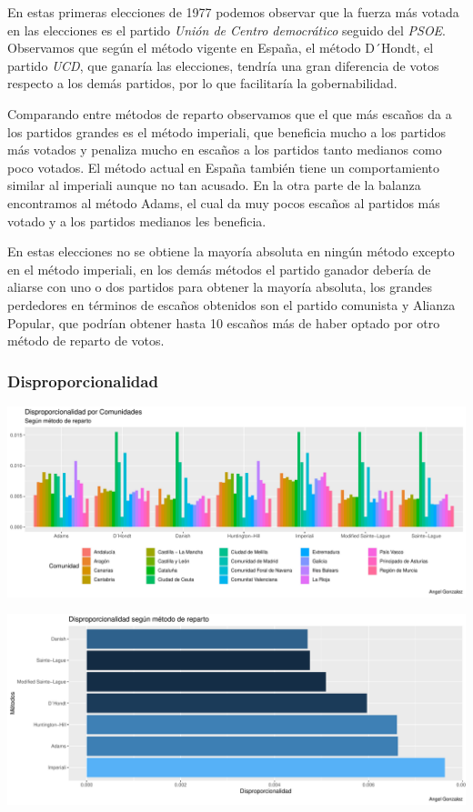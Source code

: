 \documentclass[12pt,a4paper,]{book}
\numberwithin{dummy}{section}
\theoremstyle{ocrenumbox}
\theoremstyle{blacknumex}
\theoremstyle{blacknumbox}
\theoremstyle{ocrenum}
\theoremstyle{ocrenum}
\begin{document}
En estas primeras elecciones de 1977 podemos observar que la fuerza más
votada en las elecciones es el partido \emph{Unión de Centro
democrático} seguido del \emph{PSOE}. Observamos que según el método
vigente en España, el método D´Hondt, el partido \emph{UCD}, que ganaría
las elecciones, tendría una gran diferencia de votos respecto a los
demás partidos, por lo que facilitaría la gobernabilidad.

Comparando entre métodos de reparto observamos que el que más escaños da
a los partidos grandes es el método imperiali, que beneficia mucho a los
partidos más votados y penaliza mucho en escaños a los partidos tanto
medianos como poco votados. El método actual en España también tiene un
comportamiento similar al imperiali aunque no tan acusado. En la otra
parte de la balanza encontramos al método Adams, el cual da muy pocos
escaños al partidos más votado y a los partidos medianos les beneficia.

En estas elecciones no se obtiene la mayoría absoluta en ningún método
excepto en el método imperiali, en los demás métodos el partido ganador
debería de aliarse con uno o dos partidos para obtener la mayoría
absoluta, los grandes perdedores en términos de escaños obtenidos son el
partido comunista y Alianza Popular, que podrían obtener hasta 10
escaños más de haber optado por otro método de reparto de votos.

\hypertarget{disproporcionalidad}{%
\subsubsection{Disproporcionalidad}\label{disproporcionalidad}}

\begin{center}\includegraphics[width=0.95\linewidth]{figurasR/unnamed-chunk-60-1} \end{center}

\begin{center}\includegraphics[width=0.95\linewidth]{figurasR/unnamed-chunk-60-2} \end{center}
\end{document}
